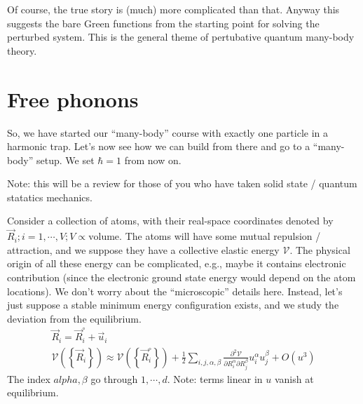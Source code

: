 Of course, the true story is (much) more complicated than that. Anyway this suggests the bare Green functions from the starting point for solving the perturbed system. This is the general theme of pertubative quantum many-body theory.

\section{Free phonons}

So, we have started our ``many-body'' course with exactly one particle in a harmonic trap. Let's now see how we can build from there and go to a ``many-body'' setup. We set $\hbar=1$ from now on.

Note: this will be a review for those of you who have taken solid state / quantum statatics mechanics.

Consider a collection of atoms, with their real-space coordinates denoted by $\vec{R}_i;i=1,\cdots,V;V\propto \text{volume}$. The atoms will have some mutual repulsion / attraction, and we suppose they have a collective elastic energy $\mathcal{V}$. The physical origin of all these energy can be complicated, e.g., maybe it contains electronic contribution (since the electronic ground state energy would depend on the atom locations). We don't worry about the ``microscopic'' details here. Instead, let's just suppose a stable minimum energy configuration exists, and we study the deviation from the equilibrium.
\begin{gather*}
    \vec{R}_i=\vec{R}_{i}^{\circ}+\vec{u}_i\\
    \mathcal{V} \left( \left\{ \vec{R}_i \right\} \right) \approx \mathcal{V} \left( \left\{ \vec{R}_{i}^{\circ} \right\} \right) +\frac{1}{2}\sum_{i,j,\alpha ,\beta}{\frac{\partial ^2\mathcal{V}}{\partial R_{i}^{\alpha}\partial R_{j}^{\beta}}u_{i}^{\alpha}u_{j}^{\beta}}+O\left( u^3 \right)
\end{gather*}
The index $alpha,\beta$ go through $1,\cdots,d$.
Note: terms linear in $u$ vanish at equilibrium.

